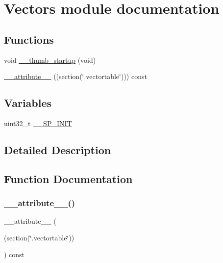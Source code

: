 \hypertarget{group___vectors__module}{}\section{Vectors module documentation}
\label{group___vectors__module}
\subsection*{Functions}
\begin{DoxyCompactItemize}
\item 
void \hyperlink{group___vectors__module_ga1291096ffdfeb4d928a6020b5e9a8ccc}{\+\_\+\+\_\+thumb\+\_\+startup} (void)
\item 
\hyperlink{group___vectors__module_ga0032ad18571ad670d92872faa8879886}{\+\_\+\+\_\+attribute\+\_\+\+\_\+} ((section(\char`\"{}.vectortable\char`\"{}))) const
\end{DoxyCompactItemize}
\subsection*{Variables}
\begin{DoxyCompactItemize}
\item 
uint32\+\_\+t \hyperlink{group___vectors__module_ga0feccbc3105c1218d4b42a36883225b2}{\+\_\+\+\_\+\+S\+P\+\_\+\+I\+N\+IT}
\end{DoxyCompactItemize}


\subsection{Detailed Description}


\subsection{Function Documentation}
\mbox{\label{group___vectors__module_ga0032ad18571ad670d92872faa8879886}} 
\subsubsection{\texorpdfstring{\+\_\+\+\_\+attribute\+\_\+\+\_\+()}{\_\_attribute\_\_()}}
{\footnotesize\ttfamily \+\_\+\+\_\+attribute\+\_\+\+\_\+ (\begin{DoxyParamCaption}\item[{(section(\char`\"{}.vectortable\char`\"{}))}]{ }\end{DoxyParamCaption}) const}

